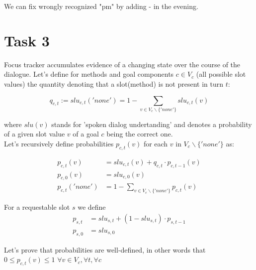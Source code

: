 \documentclass[12pt,titlepage,a4paper]{article}
\begin{document}
We can fix wrongly recognized "pm" by adding - in the evening.
\section{Task 3}
Focus tracker accumulates evidence of a changing state over the course of the dialogue. Let's define for methods and goal components $c \in V_c$ (all possible slot values) the quantity denoting that a slot(method) is not present in turn $t$:

\begin{equation}
    \label{eqn:q_c_t}
    q_{c,t} := slu_{c,t}('none') = 1 - \sum_{v \in V_c \backslash \{'none'\}}slu_{c,t}(v)
\end{equation}

\noindent where $slu(v)$ stands for 'spoken dialog undertanding' and denotes a probability of a given slot value $v$ of a goal $c$ being the correct one.\\

\noindent Let's recursively define probabilities $p_{c,t}(v)$ for each $v$ in $V_c \backslash \{'none'\}$ as: 

\begin{align}
    \label{eqn:p_c_t}
    p_{c,t}(v) &=slu_{c,t}(v) + q_{c,t} \cdot p_{c,t-1}(v) \\
    \label{eqn:p_c_0}
    p_{c,0}(v) &= slu_{c,0}(v) \\
    \label{eqn:p_c_t_none}
    p_{c,t}('none') &= 1 - \sum_{v \in V_c \backslash \{'none'\}}p_{c,t}(v)
\end{align}

\noindent For a requestable slot $s$ we define 
\begin{align}
    \label{eqn:p_s_t}
    p_{s,t} &= slu_{s,t} + (1 - slu_{s, t})\cdot p_{s,t-1} \\
    \label{eqn:p_s_0}
    p_{s,0} &= slu_{s,0}
\end{align}

\noindent Let's prove that probabilities are well-defined, in other words that $0 \leq p_{c,t}(v) \leq 1$ $\forall v \in V_c, \forall t, \forall c$
\end{document}
